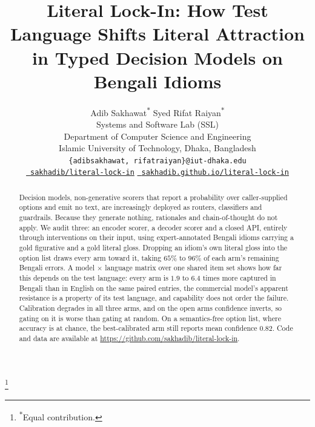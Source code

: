 \documentclass[11pt]{article}
\title{
    Literal Lock-In: How Test Language Shifts Literal Attraction\\
    in Typed Decision Models on Bengali Idioms
}
\author{
    Adib Sakhawat\textsuperscript{$*$}
    \quad
    Syed Rifat Raiyan\textsuperscript{$*$}
    \\
    Systems and Software Lab (SSL)
    \\
    Department of Computer Science and Engineering
    \\
    Islamic University of Technology, Dhaka, Bangladesh
    \\
    \texttt{\{adibsakhawat, rifatraiyan\}@iut-dhaka.edu}
    \\[3pt]
    \href{https://github.com/sakhadib/literal-lock-in}{\faGithub{}~\texttt{sakhadib/literal-lock-in}}
    \quad
    \href{https://sakhadib.github.io/literal-lock-in}{\faGlobeAmericas{}~\texttt{sakhadib.github.io/literal-lock-in}}
}
\newcommand{\blfootnote}[1]{%
    \begingroup
    \renewcommand\thefootnote{}\footnote{#1}%
    \addtocounter{footnote}{-1}%
    \endgroup
}
\begin{document}
\maketitle

\blfootnote{\textsuperscript{$*$}Equal contribution.}

\begin{abstract}
Decision models, non-generative scorers that report a probability over
caller-supplied options and emit no text, are increasingly deployed as routers,
classifiers and guardrails. Because they generate nothing, rationales and
chain-of-thought do not apply. We audit three: an encoder scorer, a decoder
scorer and a closed API, entirely through interventions on their input, using
expert-annotated Bengali idioms carrying a gold figurative and a gold literal
gloss. Dropping an idiom's own literal gloss into the option list draws every arm
toward it, taking $65\%$ to $96\%$ of each arm's remaining Bengali errors. A model
$\times$ language matrix over one shared item set shows how far this depends on
the test language: every arm is $1.9$ to $6.4$ times more captured in Bengali than
in English on the same paired entries, the commercial model's apparent resistance
is a property of its test language, and capability does not order the failure.
Calibration degrades in all three arms, and on the open arms
confidence inverts, so gating on it is worse than gating at random. On a
semantics-free option list, where accuracy is at chance, the best-calibrated arm
still reports mean confidence $0.82$. Code and data are available at
\url{https://github.com/sakhadib/literal-lock-in}.
\end{abstract}


\end{document}
